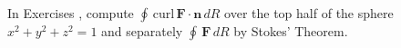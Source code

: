 {\noindent In Exercises} 
{,  compute $\oint \, \mbox{curl} \, \mathbf{F} \cdot \mathbf{n} \, dR$ over the top half of the sphere $x^2+y^2+z^2=1$ and separately $\oint \, \mathbf{F} \, dR$ by Stokes' Theorem.
}
